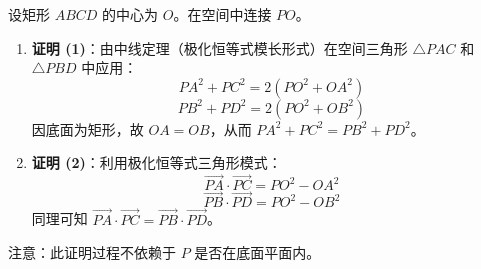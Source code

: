 \begin{proofbox}
设矩形 $ABCD$ 的中心为 $O$。在空间中连接 $PO$。
\begin{enumerate}
    \item \textbf{证明 (1)}：由中线定理（极化恒等式模长形式）在空间三角形 $\triangle PAC$ 和 $\triangle PBD$ 中应用：
    \[ PA^2 + PC^2 = 2(PO^2 + OA^2) \]
    \[ PB^2 + PD^2 = 2(PO^2 + OB^2) \]
    因底面为矩形，故 $OA = OB$，从而 $PA^2 + PC^2 = PB^2 + PD^2$。
    \item \textbf{证明 (2)}：利用极化恒等式三角形模式：
    \[ \vec{PA} \cdot \vec{PC} = PO^2 - OA^2 \]
    \[ \vec{PB} \cdot \vec{PD} = PO^2 - OB^2 \]
    同理可知 $\vec{PA} \cdot \vec{PC} = \vec{PB} \cdot \vec{PD}$。
\end{enumerate}
注意：此证明过程不依赖于 $P$ 是否在底面平面内。
\end{proofbox}
